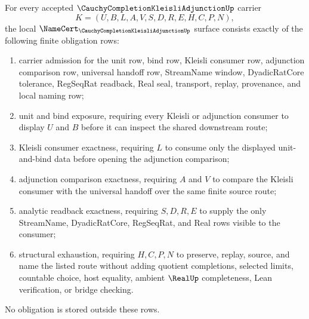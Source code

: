\begin{theorem}
\label{thm:cauchy-completion-kleisli-adjunction-obligations}
For every accepted $\CauchyCompletionKleisliAdjunctionUp$ carrier
$$
K=(U,B,L,A,V,S,D,R,E,H,C,P,N),
$$
the local $\NameCert_{\CauchyCompletionKleisliAdjunctionUp}$ surface consists exactly of the following finite obligation rows:
\begin{enumerate}
\item carrier admission for the unit row, bind row, Kleisli consumer row, adjunction comparison row, universal handoff row, StreamName window, DyadicRatCore tolerance, RegSeqRat readback, Real seal, transport, replay, provenance, and local naming row;
\item unit and bind exposure, requiring every Kleisli or adjunction consumer to display $U$ and $B$ before it can inspect the shared downstream route;
\item Kleisli consumer exactness, requiring $L$ to consume only the displayed unit-and-bind data before opening the adjunction comparison;
\item adjunction comparison exactness, requiring $A$ and $V$ to compare the Kleisli consumer with the universal handoff over the same finite source route;
\item analytic readback exactness, requiring $S,D,R,E$ to supply the only StreamName, DyadicRatCore, RegSeqRat, and Real rows visible to the consumer;
\item structural exhaustion, requiring $H,C,P,N$ to preserve, replay, source, and name the listed route without adding quotient completions, selected limits, countable choice, host equality, ambient $\RealUp$ completeness, Lean verification, or bridge checking.
\end{enumerate}
No obligation is stored outside these rows.
\end{theorem}
